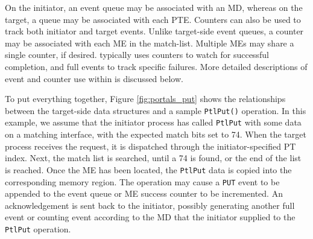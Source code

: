 On the initiator, an event queue may be associated with an MD, whereas on the
target, a queue may be associated with each PTE.  Counters can also be used to
track both initiator and target events.
Unlike target-side event queues, a counter may be
associated with each ME in the match-list. Multiple MEs may share a
single counter, if desired. \pdht typically uses counters to watch for
successful completion, and full events to track specific failures. More
detailed descriptions of event and counter use within \pdht is
discussed below.

To put everything together, Figure \ref{fig:portals_put} shows the
relationships between the target-side data structures and a sample
{\tt PtlPut()} operation. In this example, we assume that the
initiator process has called {\tt PtlPut} with some data on a matching
interface, with the expected match bits set to 74. When the target
process receives the request, it is dispatched through the
initiator-specified PT index. Next, the match list is searched, until
a 74 is found, or the end of the list is reached. Once the ME has been
located, the {\tt PtlPut} data is copied into the corresponding memory
region. The operation may cause a {\tt PUT} event to be appended to
the event queue or ME success counter to be incremented. An
acknowledgement is sent back to the initiator, possibly generating
another full event or counting event according to the MD that the initiator
supplied to the {\tt PtlPut} operation.





